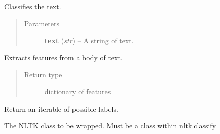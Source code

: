 \documentclass[letterpaper,10pt,english]{sphinxmanual}
\begin{document}
\begin{fulllineitems}
\begin{fulllineitems}
\end{fulllineitems}


\begin{fulllineitems}
\label{api_reference:textblob.classifiers.NLTKClassifier.classify}
Classifies the text.
\begin{quote}\begin{description}
\item[{Parameters}] \leavevmode
\textbf{text} (\emph{str}) -- A string of text.

\end{description}\end{quote}

\end{fulllineitems}


\begin{fulllineitems}
\label{api_reference:textblob.classifiers.NLTKClassifier.extract_features}
Extracts features from a body of text.
\begin{quote}\begin{description}
\item[{Return type}] \leavevmode
dictionary of features

\end{description}\end{quote}

\end{fulllineitems}


\begin{fulllineitems}
\label{api_reference:textblob.classifiers.NLTKClassifier.labels}
Return an iterable of possible labels.

\end{fulllineitems}


\begin{fulllineitems}
\label{api_reference:textblob.classifiers.NLTKClassifier.nltk_class}
The NLTK class to be wrapped. Must be a class within nltk.classify


\end{fulllineitems}
\end{fulllineitems}
\end{document}
